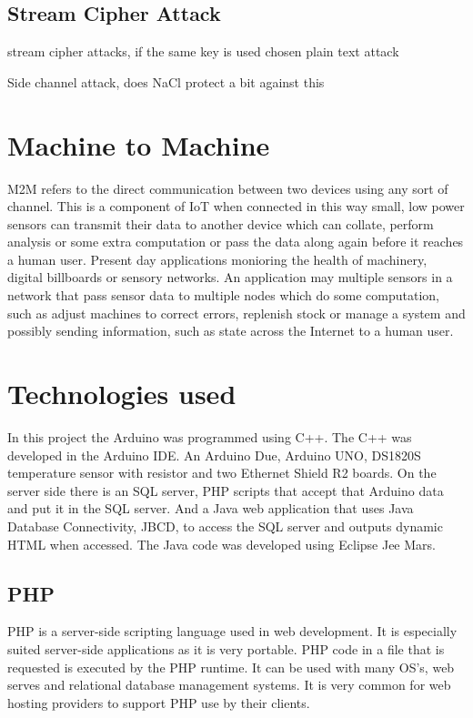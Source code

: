 \subsection{Stream Cipher Attack}

stream cipher attacks, if the same key is used
chosen plain text attack

Side channel attack, does NaCl protect a bit against this

\section{Machine to Machine}

M2M refers to the direct communication between two devices using any sort of channel. This is a component of IoT when connected in this way small, low power sensors can transmit their data to another device which can collate, perform analysis or some extra computation or pass the data along again before it reaches a human user. Present day applications monioring the health of machinery, digital billboards or sensory networks. An application may multiple sensors in a network that pass sensor data to multiple nodes which do some computation, such as adjust machines to correct errors, replenish stock or manage a system and possibly sending information, such as state across the Internet to a human user.

\section{Technologies used}

In this project the Arduino was programmed using C++. The C++ was developed in the Arduino IDE. An Arduino Due, Arduino UNO, DS1820S temperature sensor with resistor and two Ethernet Shield R2 boards. On the server side there is an SQL server, PHP scripts that accept that Arduino data and put it in the SQL server. And a Java web application that uses Java Database Connectivity, JBCD, to access the SQL server and outputs dynamic HTML when accessed. The Java code was developed using Eclipse Jee Mars.

\subsection{PHP}
PHP is a server-side scripting language used in web development. It is especially suited server-side applications as it is very portable. PHP code in a file that is requested is executed by the PHP runtime. It can be used with many OS's, web serves and relational database management systems. It is very common for web hosting providers to support PHP use by their clients.

